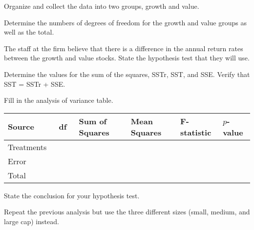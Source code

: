\begin{problem}
  \item Organize and collect the data into two groups, growth  and
    value. 
    \vfill

  \item Determine the numbers of degrees of freedom for the growth and
    value groups as well as the total.

    \vspace{5em}

  \item The staff at the firm believe that there is a difference in
    the annual return rates between the growth and value stocks. State
    the hypothesis test that they will use.

    \vfill

    \clearpage
    
  \item Determine the values for the sum of the squares, SSTr, SST,
    and SSE.  Verify that SST = SSTr + SSE.

    \vfill

  \item Fill in the analysis of variance table. 

    \begin{tabular}{|l|l|l|l|l|l|} \hline
      Source & ~df~ & Sum of Squares & Mean Squares & F-statistic & $p$-value \\ \hline
      Treatments & & & & & \\ \hline
      Error & & & & \cellcolor{black!75} &  \cellcolor{black!75} \\ \hline
      Total & & & \cellcolor{black!75} & \cellcolor{black!75} & \cellcolor{black!75}  \\ \hline
    \end{tabular}

  \item State the conclusion for your hypothesis test.

    \vspace{5em}

    \clearpage

  \item Repeat the previous analysis but use the three different sizes
    (small, medium, and large cap) instead.

    \clearpage
    

\end{problem}
